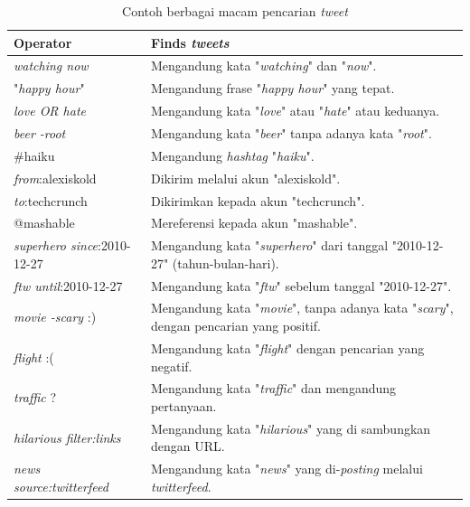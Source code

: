 \begin{table}[h]
\caption{Contoh berbagai macam pencarian \textit{tweet}}
\label{tab:MacamPencarianTweet}
\begin{tabular}{|p{5cm}|p{9cm}|}
\hline
\textbf{Operator}          					& \textbf{Finds \textit{tweets}}                                            \\ \hline
\textit{watching now}               & Mengandung kata "\textit{watching}" dan "\textit{now}".						       \\
"\textit{happy hour}"               & Mengandung frase "\textit{happy hour}" yang tepat.                                 \\
\textit{love OR hate}               & Mengandung kata "\textit{love}" atau "\textit{hate}" atau keduanya.                             \\
\textit{beer -root}                 & Mengandung kata "\textit{beer}" tanpa adanya kata "\textit{root}".                                         \\
\#haiku                    					& Mengandung \textit{hashtag} "\textit{haiku}".                                            \\
\textit{from}:alexiskold            & Dikirim melalui akun "alexiskold".                                            \\
\textit{to}:techcrunch              & Dikirimkan kepada akun "techcrunch".                                              \\
@mashable                  					& Mereferensi kepada akun "mashable".                                            \\
\textit{superhero since}:2010-12-27 & Mengandung kata "\textit{superhero}" dari tanggal "2010-12-27" (tahun-bulan-hari). \\
\textit{ftw until}:2010-12-27       & Mengandung kata "\textit{ftw}" sebelum tanggal "2010-12-27".                   \\
\textit{movie -scary} :)            & Mengandung kata "\textit{movie}", tanpa adanya kata "\textit{scary}", dengan pencarian yang positif.        \\
\textit{flight} :(                  & Mengandung kata "\textit{flight}" dengan pencarian yang negatif.                         \\
\textit{traffic} ?                  & Mengandung kata "\textit{traffic}" dan mengandung pertanyaan.                               \\
\textit{hilarious filter:links}     & Mengandung kata "\textit{hilarious}" yang di sambungkan dengan URL.                                \\
\textit{news source:twitterfeed}    & Mengandung kata "\textit{news}" yang di-\textit{posting} melalui \textit{twitterfeed}.						\\        \hline                     
\end{tabular}
\end{table}

